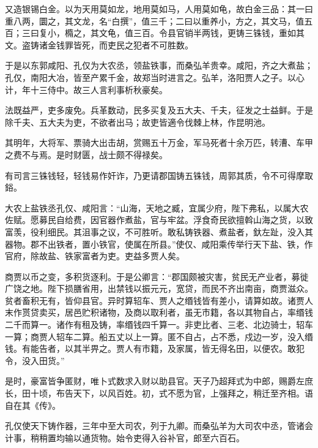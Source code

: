 \documentclass[12pt,UTF8]{ctexbook}
\begin{document}
又造银锡白金。以为天用莫如龙，地用莫如马，人用莫如龟，故白金三品：其一曰重八两，圜之，其文龙，名“白撰”，值三千；二曰以重养小，方之，其文马，值五百；三曰复小，橢之，其文龟，值三百。令县官销半两钱，更铸三铢钱，重如其文。盗铸诸金钱罪皆死，而吏民之犯者不可胜数。



于是以东郭咸阳、孔仅为大农丞，领盐铁事，而桑弘羊贵幸。咸阳，齐之大煮盐；孔仅，南阳大冶，皆至产累千金，故郑当时进言之。弘羊，洛阳贾人之子。以心计，年十三侍中。故三人言利事析秋豪矣。



法既益严，吏多废免。兵革数动，民多买复及五大夫、千夫，征发之士益鲜。于是除千夫、五大夫为吏，不欲者出马；故吏皆適令伐棘上林，作昆明池。



其明年，大将军、票骑大出击胡，赏赐五十万金，军马死者十余万匹，转漕、车甲之费不与焉。是时财匮，战士颇不得禄矣。



有司言三铢钱轻，轻钱易作奸诈，乃更请郡国铸五铢钱，周郭其质，令不可得摩取鋊。



大农上盐铁丞孔仅、咸阳言：“山海，天地之臧，宜属少府，陛下弗私，以属大农佐赋。愿募民自给费，因官器作煮盐，官与牢盆。浮食奇民欲擅斡山海之货，以致富羡，役利细民。其沮事之议，不可胜听。敢私铸铁器、煮盐者，釱左趾，没入其器物。郡不出铁者，置小铁官，使属在所县。”使仅、咸阳乘传举行天下盐、铁，作官府，除故盐、铁家富者为吏。吏益多贾人矣。



商贾以币之变，多积货逐利。于是公卿言：“郡国颇被灾害，贫民无产业者，募徙广饶之地。陛下损膳省用，出禁钱以振元元，宽贷，而民不齐出南亩，商贾滋众。贫者畜积无有，皆仰县官。异时算轺车、贾人之缗钱皆有差小，请算如故。诸贾人末作贳贷卖买，居邑贮积诸物，及商以取利者，虽无市籍，各以其物自占，率缗钱二千而算一。诸作有租及铸，率缗钱四千算一。非吏比者、三老、北边骑士，轺车一算；商贾人轺车二算。船五丈以上一算。匿不自占，占不悉，戍边一岁，没入缗钱。有能告者，以其半畀之。贾人有市籍，及家属，皆无得名田，以便农。敢犯令，没入田货。”



是时，豪富皆争匿财，唯卜式数求入财以助县官。天子乃超拜式为中郎，赐爵左庶长，田十顷，布告天下，以风百姓。初，式不愿为官，上强拜之，稍迁至齐相。语自在其《传》。



孔仅使天下铸作器，三年中至大司农，列于九卿。而桑弘羊为大司农中丞，管诸会计事，稍稍置均输以通货物。始令吏得入谷补官，郎至六百石。
\end{document}
